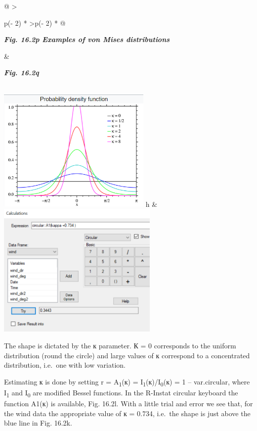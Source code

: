 \documentclass[
  letterpaper,
  DIV=11,
  numbers=noendperiod]{scrreprt}
\begin{document}
\begin{longtable}[]{@{}
  >{\raggedright\arraybackslash}p{(\columnwidth - 2\tabcolsep) * }
  >{\centering\arraybackslash}p{(\columnwidth - 2\tabcolsep) * }@{}}
\toprule\noalign{}
\begin{minipage}[b]{\linewidth}\raggedright
\textbf{\emph{Fig. 16.2p Examples of von Mises distributions}}
\end{minipage} & \begin{minipage}[b]{\linewidth}\centering
\textbf{\emph{Fig. 16.2q}}
\end{minipage} \\
\midrule\noalign{}
\endhead
\bottomrule\noalign{}
\endlastfoot
\includegraphics[width=2.93974in,height=2.36025in]{figures/Fig16.2p.png}
h &
\includegraphics[width=3.07069in,height=\textheight]{figures/Fig16.2q.png} \\
\end{longtable}

The shape is dictated by the к parameter. К = 0 corresponds to the
uniform distribution (round the circle) and large values of к correspond
to a concentrated distribution, i.e.~one with low variation.

Estimating к is done by setting r = A\textsubscript{1}(к) =
I\textsubscript{1}(к)/I\textsubscript{0}(к) = 1 -- var.circular, where
I\textsubscript{1} and I\textsubscript{0} are modified Bessel functions.
In the R-Instat circular keyboard the function A1(к) is available, Fig.
16.2l. With a little trial and error we see that, for the wind data the
appropriate value of к = 0.734, i.e.~the shape is just above the blue
line in Fig. 16.2k.
\end{document}

